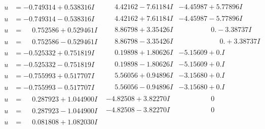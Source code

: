 \documentclass[1p]{elsarticle_modified}
\theoremstyle{definition}
\begin{document}
$$\begin{array}{c|c|c}
\begin{aligned}
u &= -0.749314 + 0.538316 I\end{aligned}
 & \phantom{-}4.42162 - 7.61184 I & -4.45987 + 5.77896 I \\ \hline\begin{aligned}
u &= -0.749314 - 0.538316 I\end{aligned}
 & \phantom{-}4.42162 + 7.61184 I & -4.45987 - 5.77896 I \\ \hline\begin{aligned}
u &= \phantom{-}0.752586 + 0.529461 I\end{aligned}
 & \phantom{-}8.86798 + 3.35426 I & \phantom{-0.000000 } 0. - 3.38737 I \\ \hline\begin{aligned}
u &= \phantom{-}0.752586 - 0.529461 I\end{aligned}
 & \phantom{-}8.86798 - 3.35426 I & \phantom{-0.000000 -}0. + 3.38737 I \\ \hline\begin{aligned}
u &= -0.525332 + 0.751819 I\end{aligned}
 & \phantom{-}0.19898 + 1.80626 I & -5.15609 + 0. I\phantom{ +0.000000I} \\ \hline\begin{aligned}
u &= -0.525332 - 0.751819 I\end{aligned}
 & \phantom{-}0.19898 - 1.80626 I & -5.15609 + 0. I\phantom{ +0.000000I} \\ \hline\begin{aligned}
u &= -0.755993 + 0.517707 I\end{aligned}
 & \phantom{-}5.56056 + 0.94896 I & -3.15680 + 0. I\phantom{ +0.000000I} \\ \hline\begin{aligned}
u &= -0.755993 - 0.517707 I\end{aligned}
 & \phantom{-}5.56056 - 0.94896 I & -3.15680 + 0. I\phantom{ +0.000000I} \\ \hline\begin{aligned}
u &= \phantom{-}0.287923 + 1.044900 I\end{aligned}
 & -4.82508 + 3.82270 I & \phantom{-0.000000 } 0 \\ \hline\begin{aligned}
u &= \phantom{-}0.287923 - 1.044900 I\end{aligned}
 & -4.82508 - 3.82270 I & \phantom{-0.000000 } 0 \\ \hline\begin{aligned}
u &= \phantom{-}0.081808 + 1.082030 I\end{aligned}

\end{array}$$
\end{document}

